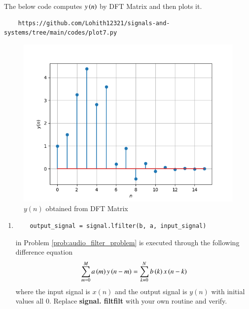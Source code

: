 \documentclass[journal,12pt,twocolumn]{IEEEtran}
\theoremstyle{remark}
\begin{document}
\begin{enumerate}[label=\thesection.\arabic*
,ref=\thesection.\theenumi]
\begin{enumerate}[label=\thesection.\arabic*
,ref=\thesection.\theenumi]
The below code computes $y\left(n\right)$ by DFT Matrix and then plots it.\\
\begin{lstlisting}
    https://github.com/Lohith12321/signals-and-systems/tree/main/codes/plot7.py 
\end{lstlisting}
\begin{figure}[ht]
\centering
\includegraphics[width=\columnwidth]{figs/plot7.png}
\caption{$y(n)$ obtained from DFT Matrix}
\label{fig:plot6}
\end{figure}
\end{enumerate}
\begin{enumerate}[label=\thesection.\arabic*
,ref=\thesection.\theenumi]
\section{Exercises}
Answer the following questions by looking at the python code in Problem \ref{prob:audio_filter_problem}.
\item
\begin{lstlisting}
	output_signal = signal.lfilter(b, a, input_signal)
\end{lstlisting}
in Problem \ref{prob:audio_filter_problem} is executed through the following difference equation
\begin{equation}
\label{eq:iir_filter_gen}
 \sum _{m=0}^{M}a\left(m\right)y\left(n-m\right)=\sum _{k=0}^{N}b\left(k\right)x\left(n-k\right) 
\end{equation}
%
where the input signal is $x(n)$ and the output signal is $y(n)$ with initial values all 0. Replace
\textbf{signal. filtfilt} with your own routine and verify.\\


\end{enumerate}
\end{enumerate}
\end{document}

